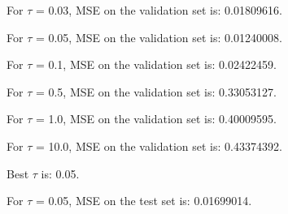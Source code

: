 \begin{answer}

    For $\tau$ = 0.03, MSE on the validation set is: 0.01809616.

    For $\tau$ = 0.05, MSE on the validation set is: 0.01240008.

    For $\tau$ = 0.1, MSE on the validation set is: 0.02422459.

    For $\tau$ = 0.5, MSE on the validation set is: 0.33053127.

    For $\tau$ = 1.0, MSE on the validation set is: 0.40009595.

    For $\tau$ = 10.0, MSE on the validation set is: 0.43374392.

    Best $\tau$ is: 0.05.

    For $\tau$ = 0.05, MSE on the test set is: 0.01699014.


\end{answer}
